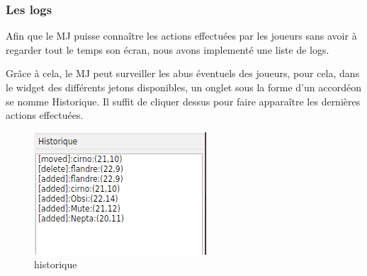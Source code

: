 \subsubsection{Les logs}

Afin que le MJ puisse connaître les actions effectuées par les joueurs sans avoir à regarder tout le temps son écran, nous avons implementé une  liste de logs.

Grâce à cela, le MJ peut surveiller les abus éventuels des joueurs, pour cela, dans le widget des différents jetons disponibles, un onglet sous la forme d'un accordéon se nomme \og Historique\fg{}. Il suffit de cliquer dessus pour faire apparaître les dernières actions effectuées.

\begin{figure}[h!]
    \centering
    \includegraphics[scale=0.7]{img/log.png}
    \caption{historique}
    \label{fig:log}
\end{figure}
